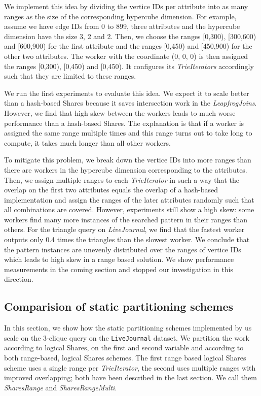 We implement this idea by dividing the vertice IDs per attribute into as many ranges as the size of the corresponding hypercube dimension.
For example, assume we have edge IDs from 0 to 899, three attributes and the hypercube dimension have the size 3, 2 and 2.
Then, we choose the ranges [0,300), [300,600) and [600,900) for the first attribute and the ranges [0,450) and [450,900) for the other
two attributes.
The worker with the coordinate (0, 0, 0) is then assigned the ranges [0,300), [0,450) and [0,450).
It configures its \textit{TrieIterators} accordingly such that they are limited to these ranges.

We run the first experiments to evaluate this idea.
We expect it to scale better than a hash-based Shares because it saves intersection work in the \textit{LeapfrogJoins}.
However, we find that high skew between the workers leads to much worse performance than a hash-based Shares.
The explanation is that if a worker is assigned the same range multiple times and this range turns out to take long to compute, it takes
much longer than all other workers.

To mitigate this problem, we break down the vertice IDs into more ranges than there are workers in the hypercube dimension corresponding to
the attributes.
Then, we assign multiple ranges to each \textit{TrieIterator} in such a way that the overlap on the first two attributes equals the overlap
of a hash-based implementation and assign the ranges of the later attributes randomly such that all combinations are covered.
However, experiments still show a high skew: some workers find many more instances of the searched pattern in their ranges than others.
For the triangle query on \textit{LiveJournal}, we find that the fastest worker outputs only 0.4 times the triangles than the slowest worker.
We conclude that the pattern instances are unevenly distributed over the ranges of vertice IDs which leads to high skew in
a range based solution.
We show performance measurements in the coming section and stopped our investigation in this direction.


\subsection{Comparision of static partitioning schemes} \label{subsec:statical-partitioning-experiment}
In this section, we show how the static partitioning schemes implemented by us scale on the 3-clique query on the
\texttt{LiveJournal} dataset.
We partition the work according to logical Shares, on the first and second variable and according to both range-based, logical Shares schemes.
The first range based logical Shares scheme uses a single range per \textit{TrieIterator}, the second uses multiple ranges with improved
overlapping;
both have been described in the last section.
We call them \textit{SharesRange} and \textit{SharesRangeMulti}.

